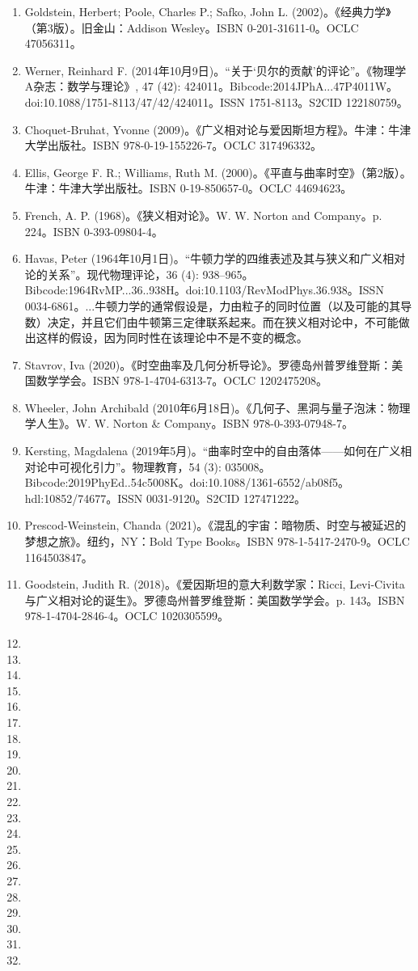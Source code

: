 \begin{enumerate}
\item Goldstein, Herbert; Poole, Charles P.; Safko, John L. (2002)。《经典力学》（第3版）。旧金山：Addison Wesley。ISBN 0-201-31611-0。OCLC 47056311。
\item Werner, Reinhard F. (2014年10月9日)。“关于‘贝尔的贡献’的评论”。《物理学A杂志：数学与理论》, 47 (42): 424011。Bibcode:2014JPhA...47P4011W。doi:10.1088/1751-8113/47/42/424011。ISSN 1751-8113。S2CID 122180759。
\item Choquet-Bruhat, Yvonne (2009)。《广义相对论与爱因斯坦方程》。牛津：牛津大学出版社。ISBN 978-0-19-155226-7。OCLC 317496332。
\item Ellis, George F. R.; Williams, Ruth M. (2000)。《平直与曲率时空》（第2版）。牛津：牛津大学出版社。ISBN 0-19-850657-0。OCLC 44694623。
\item French, A. P. (1968)。《狭义相对论》。W. W. Norton and Company。p. 224。ISBN 0-393-09804-4。
\item Havas, Peter (1964年10月1日)。“牛顿力学的四维表述及其与狭义和广义相对论的关系”。现代物理评论，36 (4): 938–965。Bibcode:1964RvMP...36..938H。doi:10.1103/RevModPhys.36.938。ISSN 0034-6861。...牛顿力学的通常假设是，力由粒子的同时位置（以及可能的其导数）决定，并且它们由牛顿第三定律联系起来。而在狭义相对论中，不可能做出这样的假设，因为同时性在该理论中不是不变的概念。
\item Stavrov, Iva (2020)。《时空曲率及几何分析导论》。罗德岛州普罗维登斯：美国数学学会。ISBN 978-1-4704-6313-7。OCLC 1202475208。
\item Wheeler, John Archibald (2010年6月18日)。《几何子、黑洞与量子泡沫：物理学人生》。W. W. Norton & Company。ISBN 978-0-393-07948-7。
\item Kersting, Magdalena (2019年5月)。“曲率时空中的自由落体——如何在广义相对论中可视化引力”。物理教育，54 (3): 035008。Bibcode:2019PhyEd..54c5008K。doi:10.1088/1361-6552/ab08f5。hdl:10852/74677。ISSN 0031-9120。S2CID 127471222。
\item Prescod-Weinstein, Chanda (2021)。《混乱的宇宙：暗物质、时空与被延迟的梦想之旅》。纽约，NY：Bold Type Books。ISBN 978-1-5417-2470-9。OCLC 1164503847。
\item Goodstein, Judith R. (2018)。《爱因斯坦的意大利数学家：Ricci, Levi-Civita与广义相对论的诞生》。罗德岛州普罗维登斯：美国数学学会。p. 143。ISBN 978-1-4704-2846-4。OCLC 1020305599。
\item 
\item 
\item 
\item 
\item 
\item 
\item 
\item 
\item 
\item 
\item 
\item 
\item 
\item 
\item 
\item 
\item 
\item 
\item 
\item 
\item 

\end{enumerate}